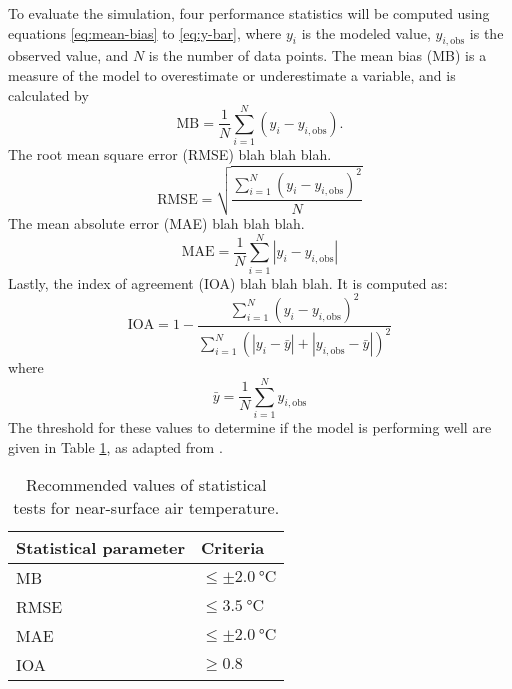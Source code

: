 	To evaluate the simulation, four performance statistics will be computed using equations \ref{eq:mean-bias} to \ref{eq:y-bar},
		where $y_i$ is the modeled value, $y_{i,\text{obs}}$ is the observed value, and $N$ is the number of data points.
	The mean bias (MB) is a measure of the model to overestimate or underestimate a variable, and is calculated by
	\begin{equation}
		\text{MB} =
			\frac{1}{N}
			\sum_{i=1}^{N}
			(y_i - y_{i,\text{obs}}).
			\label{eq:mean-bias}
	\end{equation}
	The root mean square error (RMSE) blah blah blah.
	\begin{equation}
		\text{RMSE} =
			\sqrt{
				\frac{
					\sum_{i=1}^{N}
					(y_i - y_{i,\text{obs}}) ^ 2
				}{N}
			}
			\label{eq:root-mean-square-error}
	\end{equation}
	The mean absolute error (MAE) blah blah blah.
	\begin{equation}
		\text{MAE} =
			\frac{1}{N}
			\sum_{i=1}^{N} 
			|y_i - y_{i,\text{obs}}| \label{eq:mean-absolute-error}
	\end{equation}
	Lastly, the index of agreement (IOA) blah blah blah. It is computed as:
	\begin{equation}
		\text{IOA} =
			1 - 
			\frac{
				\sum_{i=1}^{N}
				(y_i - y_{i,\text{obs}}) ^ 2
			}{
				\sum_{i=1}^{N} (
					|y_i - \bar{y}| +
					|y_{i,\text{obs}} - \bar{y}|
				)^2
			}
			\label{eq:index-of-agreement}
	\end{equation}
	where
	\begin{equation}
		\bar{y} = 
			\frac{1}{N}
			\sum_{i=1}^{N} y_{i,\text{obs}}
			\label{eq:y-bar}
	\end{equation}
	The threshold for these values to determine if the model is performing well are given in Table \ref{tab:performance-statistics-threshold}, as adapted from \textcite{Bilang2022}.

	\begin{table}	
		\caption{Recommended values of statistical tests for near-surface air temperature.}
		\label{tab:performance-statistics-threshold}
		\centering
		\begin{tabular}{l l}
			\hline \hline
			Statistical parameter & Criteria\\
			\hline
			MB & $\leq \pm \qty{2.0}{\degreeCelsius}$ \\
			RMSE & $\leq \qty{3.5}{\degreeCelsius}$\\
			MAE & $\leq \pm \qty{2.0}{\degreeCelsius}$\\
			IOA	& $\geq \num{0.8}$\\
			\hline
		\end{tabular}		
	\end{table}


